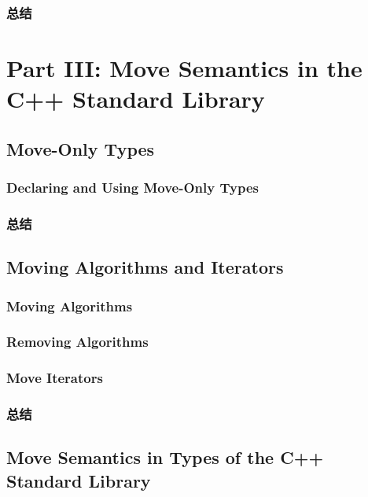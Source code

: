 \documentclass[11pt,a4paper,UTF8]{ctexart}
\begin{document}
		\subsubsection{总结}
		
	\section{Part III: Move Semantics in the C++ Standard Library}
	\subsection{Move-Only Types}
		\subsubsection{Declaring and Using Move-Only Types}
		\subsubsection{总结}
	\subsection{Moving Algorithms and Iterators}
		\subsubsection{Moving Algorithms}
		\subsubsection{Removing Algorithms}
		\subsubsection{Move Iterators}
		\subsubsection{总结}
	\subsection{Move Semantics in Types of the C++ Standard Library}
\end{document}
